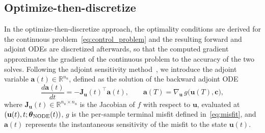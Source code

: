 \documentclass[pdflatex,sn-mathphys-num]{sn-jnl}%
\newcommand{\bfu}{\mathbf{u}}
\newcommand{\bfc}{\mathbf{c}}
\newcommand{\bftheta}{\boldsymbol{\theta}}
\newcommand{\bfa}{\mathbf{a}}
\theoremstyle{thmstyleone}%
\theoremstyle{thmstyletwo}%
\theoremstyle{thmstylethree}%
\begin{document}
\subsection{Optimize-then-discretize}\label{sect:optdisc}\label{subsubsect:stability_prob}

In the optimize-then-discretize approach, the optimality conditions are derived for the continuous problem~\eqref{eq:control_problem} and the resulting forward and adjoint ODEs are discretized afterwards, so that the computed gradient approximates the gradient of the continuous problem to the accuracy of the two solves.
%
Following the adjoint sensitivity method~\cite{ChenEtAl2018},
we introduce the adjoint variable $\bfa(t) \in \mathbb{R}^{n_u}$, defined as the solution of the backward adjoint ODE
\begin{equation}
\frac{d\bfa(t)}{dt}
=
- \mathbf{J}_{\bfu}(t)^\top
\bfa(t),
\qquad
\bfa(T) = \nabla_{\bfu}\, g\big(\bfu(T),\bfc\big),
\label{eq:adjoint}
\end{equation}
where $\mathbf{J}_{\bfu}(t) \in \mathbb{R}^{n_u\times n_u}$ is the Jacobian of $f$ with respect to $\bfu$, evaluated at $(\bfu(t), t; \bftheta_{\rm NODE}(t))$, $g$ is the per-sample terminal misfit defined in~\eqref{eq:misfit}, and $\bfa(t)$ represents the instantaneous sensitivity of the misfit to the state $\bfu(t)$.
\end{document}
